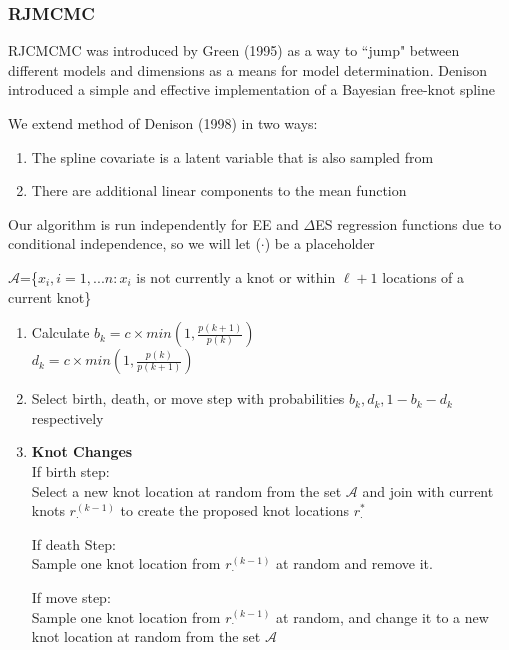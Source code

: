 \documentclass[handout]{beamer}\usepackage[]{graphicx}\usepackage[]{color}
\begin{document}
\begin{frame}
\frametitle{RJMCMC}
RJCMCMC was introduced by Green (1995) as a way to ``jump" between different models and dimensions as a means for model determination. Denison introduced a simple and effective implementation of a Bayesian free-knot spline

\vspace{0.3cm}

We extend method of Denison (1998) in two ways:
\begin{enumerate}
\item
The spline covariate is a latent variable that is also sampled from
\item
There are additional linear components to the mean function
\end{enumerate}

\vspace{0.3cm}
Our algorithm is run independently for EE and $\Delta$ES regression functions due to conditional independence, so we will let ($\cdot$) be a placeholder

\end{frame}

\begin{frame}
\small
$\mathcal{A}$=\{$x_i,i=1,...n:x_i$ is not currently a knot or within $\ell+1$ locations of a current knot\}


\begin{enumerate}
\item
Calculate $b_k = c \times min\left(1, \frac{p(k+1)}{p(k)} \right)$ \\
$d_k = c \times min\left(1, \frac{p(k)}{p(k+1)} \right)$ 

\item
Select birth, death, or move step with probabilities $b_k,d_k,1-b_k-d_k$ respectively \\

\item
{\bf Knot Changes} \\
If birth step:\\
Select a new knot location at random from the set $\mathcal{A}$ and join with current knots $r_{\cdot}^{(k-1)}$ to create the proposed knot locations $r_{\cdot}^{*}$

If death Step:\\
Sample one knot location from $r_{\cdot}^{(k-1)}$ at random and remove it. 

If move step:\\
Sample one knot location from $r_{\cdot}^{(k-1)}$ at random, and change it to a new knot location at random from the set $\mathcal{A}$

\end{enumerate}
\end{frame}
\end{document}
